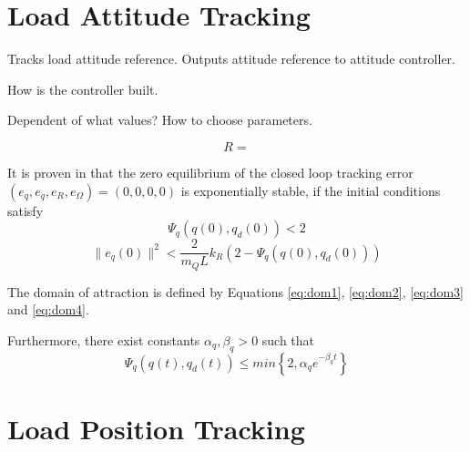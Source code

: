 \section{Load Attitude Tracking}

Tracks load attitude reference. Outputs attitude reference to attitude controller.
	
How is the controller built.

Dependent of what values? 	How to choose parameters.

\begin{figure}[h!]
	\centering
	\caption{\label{fig:con.loadattloop}}
\end{figure}		

\begin{equation}\label{eq:con.R}
R = 
\end{equation}


It is proven in \cite{Sreenath2013c} that the zero equilibrium of the closed loop tracking error $ (e_q,e_{\dot{q}},e_R,e_\Omega)=(0,0,0,0) $ is exponentially stable, if the initial conditions satisfy
\begin{equation}\label{eq:dom3}
\Psi_q(q(0),q_d(0))<2
\end{equation}
\begin{equation}\label{eq:dom4}
\parallel e_{\dot{q}}(0)\parallel^2<\frac{2}{m_QL}{k_R}(2-\Psi_q(q(0),q_d(0)))
\end{equation}

The domain of attraction is defined by Equations \ref{eq:dom1}, \ref{eq:dom2}, \ref{eq:dom3} and \ref{eq:dom4}.

Furthermore, there exist constants $ \alpha_q,\beta_q>0 $ such that
\begin{equation}\label{key}
\Psi_q(q(t),q_d(t)) \leq min\left\lbrace 2,\alpha_qe^{-\beta_qt}\right\rbrace 
\end{equation}

\section{Load Position Tracking}


